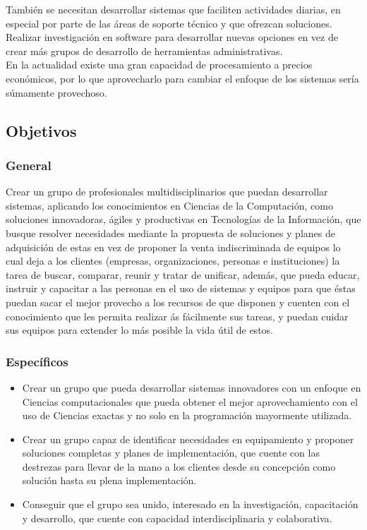 \documentclass[12pt,spanish,lettersize]{article}
\begin{document}
Tambi\'en se necesitan desarrollar sistemas que faciliten actividades diarias, en especial por parte de las \'areas de soporte t\'ecnico y que ofrezcan soluciones.\\

Realizar investigaci\'on en software para desarrollar nuevas opciones en vez de crear m\'as grupos de desarrollo de herramientas administrativas.\\

En la actualidad existe una gran capacidad de procesamiento a precios econ\'omicos, por lo que aprovecharlo para cambiar el enfoque de los sistemas ser\'ia s\'umamente provechoso.

\subsection{Objetivos}
\subsubsection{General}
Crear un grupo de profesionales multidisciplinarios que puedan desarrollar sistemas, aplicando los conocimientos en Ciencias de la Computaci\'on, como soluciones innovadoras, \'agiles y productivas en Tecnolog\'ias de la Informaci\'on, que busque resolver necesidades mediante la propuesta de soluciones y planes de adquisici\'on de estas en vez de proponer la venta indiscriminada de equipos lo cual deja a los clientes (empresas, organizaciones, personas e instituciones) la tarea de buscar, comparar, reunir y tratar de unificar, adem\'as, que pueda educar, instruir y capacitar a las personas en el uso de sistemas y equipos para que \'estas puedan sacar el mejor provecho a los recursos de que disponen y cuenten con el conocimiento que les permita realizar \'as f\'acilmente sus tareas, y puedan cuidar sus equipos para extender lo m\'as posible la vida \'util de estos.
\subsubsection{Espec\'ificos}
\begin{itemize}
\item Crear un grupo que pueda desarrollar sistemas innovadores con un enfoque en Ciencias computacionales que pueda obtener el mejor aprovechamiento con el uso de Ciencias exactas y no solo en la programaci\'on mayormente utilizada.
\item Crear un grupo capaz de identificar necesidades en equipamiento y proponer soluciones completas y planes de implementaci\'on, que cuente con las destrezas para llevar de la mano a los clientes desde su concepci\'on como soluci\'on hasta su plena implementaci\'on.
\item Conseguir que el grupo sea unido, interesado en la investigaci\'on, capacitaci\'on y desarrollo, que cuente con capacidad interdisciplinaria y colaborativa.
\end{itemize}
\end{document}
